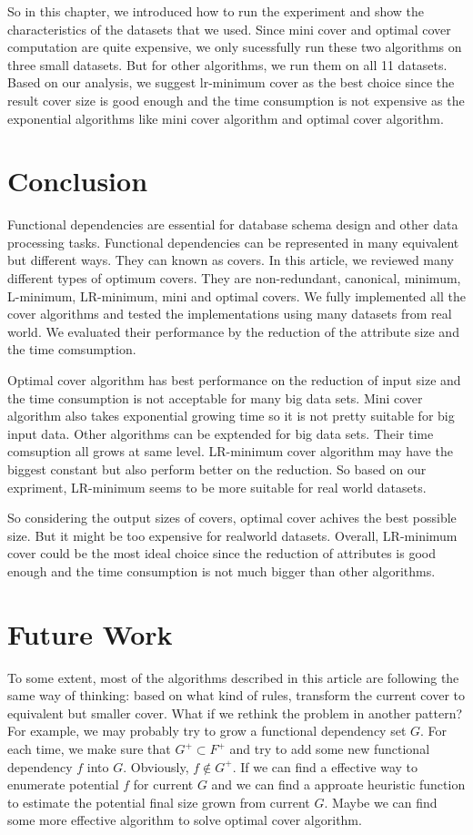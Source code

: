 \documentclass[11pt]{book}
\begin{document}
So in this chapter, we introduced how to run the experiment and show the characteristics of the datasets that we used. Since mini cover and optimal cover computation are quite expensive, we only sucessfully run these two algorithms on three small datasets. But for other algorithms, we run them on all 11 datasets. Based on our analysis, we suggest lr-minimum cover as the best choice since the result cover size is good enough and the time consumption is not expensive as the exponential algorithms like mini cover algorithm and optimal cover algorithm.

\chapter{Conclusion}

Functional dependencies are essential for database schema design and other data processing tasks. Functional dependencies can be represented in many equivalent but different ways. They can known as covers. In this article, we reviewed many different types of optimum covers. They are non-redundant, canonical, minimum, L-minimum, LR-minimum, mini and optimal covers. We fully implemented all the cover algorithms and tested the implementations using many datasets from real world. We evaluated their performance by the reduction of the attribute size and the time comsumption.

Optimal cover algorithm has best performance on the reduction of input size and the time consumption is not acceptable for many big data sets. Mini cover algorithm also takes exponential growing time so it is not pretty suitable for big input data. Other algorithms can be exptended for big data sets. Their time comsuption all grows at same level. LR-minimum cover algorithm may have the biggest constant but also perform better on the reduction. So based on our expriment, LR-minimum seems to be more suitable for real world datasets.

So considering the output sizes of covers, optimal cover achives the best possible size. But it might be too expensive for realworld datasets. Overall, LR-minimum cover could be the most ideal choice since the reduction of attributes is good enough and the time consumption is not much bigger than other algorithms.

\chapter{Future Work}

To some extent, most of the algorithms described in this article are following the same way of thinking: based on what kind of rules, transform the current cover to equivalent but smaller cover. What if we rethink the problem in another pattern? For example, we may probably try to grow a functional dependency set $G$. For each time, we make sure that $G^{+} \subset F^{+}$ and try to add some new functional dependency $f$ into $G$. Obviously, $f \not \in G^{+}$. If we can find a effective way to enumerate potential $f$ for current $G$ and we can find a approate heuristic function to estimate the potential final size grown from current $G$. Maybe we can find some more effective algorithm to solve optimal cover algorithm.
\end{document}
